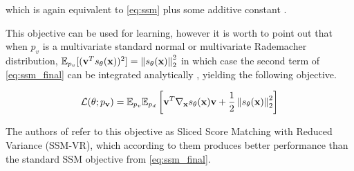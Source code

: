 which is again equivalent to \ref{eq:ssm} plus some additive constant \cite{ssm}. 

This objective can be used for learning, however
it is worth to point out that when $p_v$ is a multivariate standard normal or multivariate Rademacher distribution, 
$\mathbb{E}_{p_v} [ ( \textbf{v}^T s_\theta(\textbf{x}) )^2 ] = \left\lVert s_\theta(\textbf{x})\right\rVert_2^2$ in which case the second term 
of \ref{eq:ssm_final} can be integrated analytically \cite{ssm}, yielding the following objective.

\begin{equation}
    \label{eq:ssm_vr}
    \mathcal{L}(\theta; p_{\textbf{v}}) = \mathbb{E}_{p_v} \mathbb{E}_{p_d} \left[ \textbf{v}^T \nabla_{\textbf{x}} s_\theta(\textbf{x}) \textbf{v} + \frac{1}{2} \left\lVert s_\theta(\textbf{x}) \right\rVert^2_2 \right]
\end{equation}

The authors of \cite{ssm} refer to this objective as 
Sliced Score Matching with Reduced Variance (SSM-VR), which according to them produces better performance than the standard SSM objective from \ref{eq:ssm_final}.





